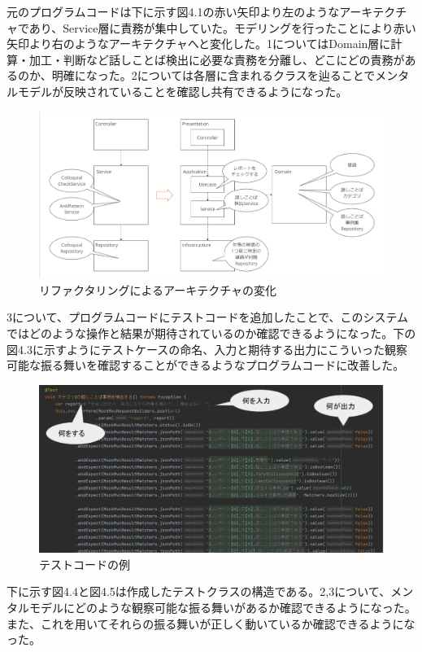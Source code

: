 \documentclass[12pt, a4paper]{jreport}
\begin{document}
元のプログラムコードは下に示す図4.1の赤い矢印より左のようなアーキテクチャであり、Service層に責務が集中していた。モデリングを行ったことにより赤い矢印より右のようなアーキテクチャへと変化した。1についてはDomain層に計算・加工・判断など話しことば検出に必要な責務を分離し、どこにどの責務があるのか、明確になった。2については各層に含まれるクラスを辿ることでメンタルモデルが反映されていることを確認し共有できるようになった。
\begin{figure}[H]
\centering
\includegraphics[width=1\linewidth]{image/kaizen1.png}
\caption{リファクタリングによるアーキテクチャの変化}
\label{fig:enter-label}
\end{figure}
3について、プログラムコードにテストコードを追加したことで、このシステムではどのような操作と結果が期待されているのか確認できるようになった。下の図4.3に示すようにテストケースの命名、入力と期待する出力にこういった観察可能な振る舞いを確認することができるようなプログラムコードに改善した。
\begin{figure}[H]
\centering
\includegraphics[width=1\linewidth]{image/kaizen3.png}
\caption{テストコードの例}
\label{fig:enter-label}
\end{figure}
下に示す図4.4と図4.5は作成したテストクラスの構造である。2,3について、メンタルモデルにどのような観察可能な振る舞いがあるか確認できるようになった。また、これを用いてそれらの振る舞いが正しく動いているか確認できるようになった。
\end{document}
